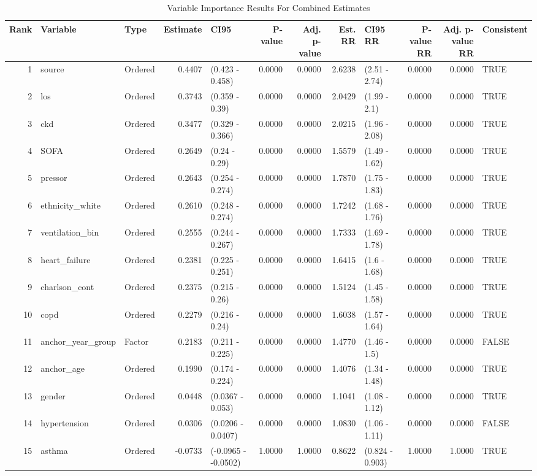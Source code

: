 \begin{table}[ht]
\centering
\caption{Variable Importance Results For Combined Estimates} 
\label{allRes}
\begin{tabular}{rllrlrrrlrrl}
  \hline
Rank & Variable & Type & Estimate & CI95 & P-value & Adj. p-value & Est. RR & CI95 RR & P-value RR & Adj. p-value RR & Consistent \\ 
  \hline
    1 & source & Ordered & 0.4407 & (0.423 - 0.458) & 0.0000 & 0.0000 & 2.6238 & (2.51 - 2.74) & 0.0000 & 0.0000 & TRUE \\ 
      2 & los & Ordered & 0.3743 & (0.359 - 0.39) & 0.0000 & 0.0000 & 2.0429 & (1.99 - 2.1) & 0.0000 & 0.0000 & TRUE \\ 
      3 & ckd & Ordered & 0.3477 & (0.329 - 0.366) & 0.0000 & 0.0000 & 2.0215 & (1.96 - 2.08) & 0.0000 & 0.0000 & TRUE \\ 
      4 & SOFA & Ordered & 0.2649 & (0.24 - 0.29) & 0.0000 & 0.0000 & 1.5579 & (1.49 - 1.62) & 0.0000 & 0.0000 & TRUE \\ 
      5 & pressor & Ordered & 0.2643 & (0.254 - 0.274) & 0.0000 & 0.0000 & 1.7870 & (1.75 - 1.83) & 0.0000 & 0.0000 & TRUE \\ 
      6 & ethnicity\_white & Ordered & 0.2610 & (0.248 - 0.274) & 0.0000 & 0.0000 & 1.7242 & (1.68 - 1.76) & 0.0000 & 0.0000 & TRUE \\ 
      7 & ventilation\_bin & Ordered & 0.2555 & (0.244 - 0.267) & 0.0000 & 0.0000 & 1.7333 & (1.69 - 1.78) & 0.0000 & 0.0000 & TRUE \\ 
      8 & heart\_failure & Ordered & 0.2381 & (0.225 - 0.251) & 0.0000 & 0.0000 & 1.6415 & (1.6 - 1.68) & 0.0000 & 0.0000 & TRUE \\ 
      9 & charlson\_cont & Ordered & 0.2375 & (0.215 - 0.26) & 0.0000 & 0.0000 & 1.5124 & (1.45 - 1.58) & 0.0000 & 0.0000 & TRUE \\ 
     10 & copd & Ordered & 0.2279 & (0.216 - 0.24) & 0.0000 & 0.0000 & 1.6038 & (1.57 - 1.64) & 0.0000 & 0.0000 & TRUE \\ 
     11 & anchor\_year\_group & Factor & 0.2183 & (0.211 - 0.225) & 0.0000 & 0.0000 & 1.4770 & (1.46 - 1.5) & 0.0000 & 0.0000 & FALSE \\ 
     12 & anchor\_age & Ordered & 0.1990 & (0.174 - 0.224) & 0.0000 & 0.0000 & 1.4076 & (1.34 - 1.48) & 0.0000 & 0.0000 & TRUE \\ 
     13 & gender & Ordered & 0.0448 & (0.0367 - 0.053) & 0.0000 & 0.0000 & 1.1041 & (1.08 - 1.12) & 0.0000 & 0.0000 & TRUE \\ 
     14 & hypertension & Ordered & 0.0306 & (0.0206 - 0.0407) & 0.0000 & 0.0000 & 1.0830 & (1.06 - 1.11) & 0.0000 & 0.0000 & FALSE \\ 
   \hline
   15 & asthma & Ordered & -0.0733 & (-0.0965 - -0.0502) & 1.0000 & 1.0000 & 0.8622 & (0.824 - 0.903) & 1.0000 & 1.0000 & TRUE \\ 
   \hline
\end{tabular}
\end{table}
